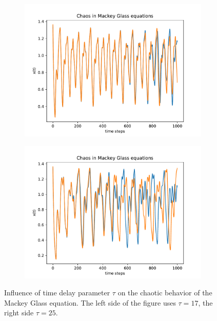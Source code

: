 \documentclass{article}
\begin{document}
\begin{figure}
  \centering
  \begin{subfigure}{.5\textwidth}
    \centering
    \includegraphics[width=\linewidth]{figures/mg_chaos_17.pdf}
  \end{subfigure} 
  \hspace{-6mm}
  \begin{subfigure}{.5\textwidth}
    \centering
    \includegraphics[width=\linewidth]{figures/mg_chaos_25.pdf}
  \end{subfigure}
  \caption{Influence of time delay parameter $\tau$ on the chaotic behavior of
    the Mackey Glass equation. The left side of the figure uses $\tau = 17$,
    the right side $\tau = 25$.}
  \label{fig:mackey_chaos}
\end{figure}
\end{document}

